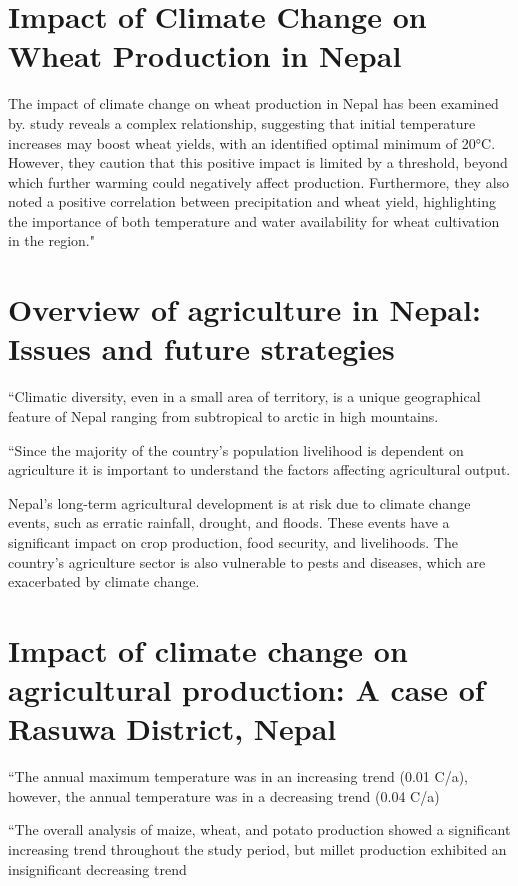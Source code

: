 \documentclass[a4paper,12pt]{article}
\begin{document}
\section{Impact of Climate Change on Wheat Production in Nepal}
\parencite{thapa-parajuliImpactClimateChange2016}
The impact of climate change on wheat production in Nepal has been examined by. \parencite{thapa-parajuliImpactClimateChange2016} study reveals a complex relationship, suggesting that initial temperature increases may boost wheat yields, with an identified optimal minimum of 20°C. However, they caution that this positive impact is limited by a threshold, beyond which further warming could negatively affect production. Furthermore, they also noted a positive correlation between precipitation and wheat yield, highlighting the importance of both temperature and water availability for wheat cultivation in the region."

\section{Overview of agriculture in Nepal: Issues and future strategies}
\parencite{gyawaliOverviewAgricultureNepal2021}

“Climatic diversity, even in a small area of territory, is a unique geographical feature of Nepal ranging from subtropical to arctic in high mountains.

“Since the majority of the country’s population livelihood is dependent on agriculture it is important to understand the factors affecting agricultural output.

Nepal’s long-term agricultural development is at risk due to climate change events, such as erratic rainfall, drought, and floods. These events have a significant impact on crop production, food security, and livelihoods. The country’s agriculture sector is also vulnerable to pests and diseases, which are exacerbated by climate change.

\section{Impact of climate change on agricultural production: A case of  Rasuwa District, Nepal}
\parencite{dawadiImpactClimateChange2022}
“The annual maximum temperature was in an increasing trend (0.01 C/a), however, the annual temperature was in a decreasing trend (0.04 C/a)

\parencite{dawadiImpactClimateChange2022}
“The overall analysis of maize, wheat, and potato production showed a significant increasing trend throughout the study period, but millet production exhibited an insignificant decreasing trend
\end{document}

